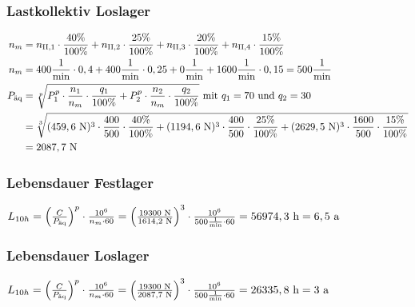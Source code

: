 \subsubsection{Lastkollektiv Loslager}
\begin{align*}
	n_m &= n_{\mathord{\mathrm{II}},1} \cdot \frac{40 \%}{100 \%} + n_{\mathord{\mathrm{II}},2} \cdot \frac{25 \%}{100 \%} + n_{\mathord{\mathrm{II}},3} \cdot \frac{20 \%}{100 \%} + n_{\mathord{\mathrm{II}},4} \cdot \frac{15 \%}{100 \%} \\
	n_m &= 400 \frac{1}{\text{min}} \cdot 0,4 + 400 \frac{1}{\text{min}} \cdot 0,25 + 0 \frac{1}{\text{min}} + 1600 \frac{1}{\text{min}} \cdot 0,15 = 500 \frac{1}{\text{min}} \\
	P_{\text{äq}} &= \sqrt[p]{P_1 ^{p} \cdot \frac{n_1}{n_m} \cdot \frac{q_1}{100\% } + P_2 ^{p} \cdot \frac{n_2}{n_m} \cdot \frac{q_2}{100 \%}} \text{ mit $q_1 = 70$ und $q_2= 30$} \\
	&= \sqrt[3]{(459,6 \text{ N}) ^{3} \cdot \frac{400}{500} \cdot \frac{40 \%}{100 \%} +(1194,6 \text{ N} )^{3} \cdot \frac{400}{500} \cdot \frac{25 \%}{100\% } +(2629,5 \text{ N} )^{3} \cdot \frac{1600}{500} \cdot \frac{15 \%}{100\% }} \\
	&= 2087,7 \text{ N}
\end{align*}

\subsubsection{Lebensdauer Festlager}
$L_{10h}= \left( \frac{C}{P_{\text{äq}}} \right) ^p \cdot \frac{10^6}{n_m \cdot 60} = \left( \frac{19300 \text{ N}}{1614,2 \text{ N}} \right) ^3 \cdot \frac{10^6}{500 \frac{1}{\text{min}} \cdot 60} = 56974,3 \text{ h} = 6,5 \text{ a}$

\subsubsection{Lebensdauer Loslager}
$L_{10h}= \left( \frac{C}{P_{\text{äq}}} \right) ^p \cdot \frac{10^6}{n_m \cdot 60} = \left( \frac{19300 \text{ N}}{2087,7 \text{ N}} \right) ^3 \cdot \frac{10^6}{500 \frac{1}{\text{min}} \cdot 60} = 26335,8 \text{ h} = 3 \text{ a}$